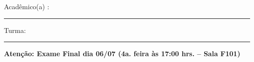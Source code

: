 \documentclass[a4paper,11pt]{article}
\begin{document}

\begin{large}
\begin{center}

\end{center}
\end{large} 

\vskip 0.2cm Acad\^emico(a) : \rule{10cm}{0.7pt} Turma:  \rule{1cm}{0.7pt}

{\bf Atenção: Exame Final dia 06/07 (4a. feira às 17:00 hrs. -- Sala F101)}
\end{document}
